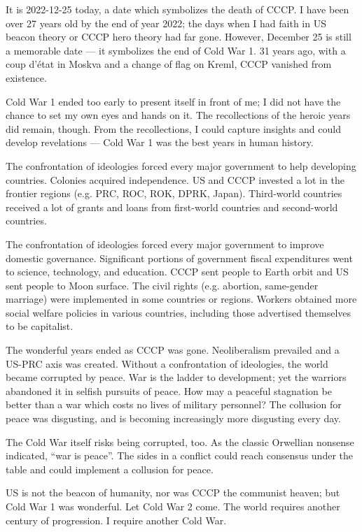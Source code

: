 
It is 2022-12-25 today, a date which symbolizes the death of CCCP.
I have been over 27 years old by the end of year 2022;
the days when I had faith in US beacon theory or CCCP hero theory had far gone.
However, December 25 is still a memorable date --- it symbolizes the end of Cold War 1.
31 years ago, with a coup d'\'etat in Moskva and a change of flag on Kreml, CCCP vanished from existence.

Cold War 1 ended too early to present itself in front of me;
I did not have the chance to set my own eyes and hands on it.
The recollections of the heroic years did remain, though.
From the recollections, I could capture insights and could develop revelations ---
Cold War 1 was the best years in human history.

The confrontation of ideologies forced every major government to help developing countries.
Colonies acquired independence.
US and CCCP invested a lot in the frontier regions (e.g. PRC, ROC, ROK, DPRK, Japan).
Third-world countries received a lot of grants and loans from first-world countries and second-world countries.

The confrontation of ideologies forced every major government to improve domestic governance.
Significant portions of government fiscal expenditures went to science, technology, and education.
CCCP sent people to Earth orbit and US sent people to Moon surface.
The civil rights (e.g. abortion, same-gender marriage) were implemented in some countries or regions.
Workers obtained more social welfare policies in various countries, including those advertised themselves to be capitalist.

The wonderful years ended as CCCP was gone.
Neoliberalism prevailed and a US-PRC axis was created.
Without a confrontation of ideologies, the world became corrupted by peace.
War is the ladder to development; yet the warriors abandoned it in selfish pursuits of peace.
How may a peaceful stagnation be better than a war which costs no lives of military personnel?
The collusion for peace was disgusting, and is becoming increasingly more disgusting every day.

The Cold War itself risks being corrupted, too.
As the classic Orwellian nonsense indicated, ``war is peace''.
The sides in a conflict could reach consensus under the table and could implement a collusion for peace.

US is not the beacon of humanity, nor was CCCP the communist heaven; but Cold War 1 was wonderful.
Let Cold War 2 come.
The world requires another century of progression.
I require another Cold War.
